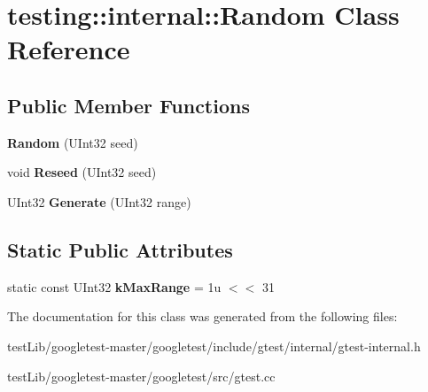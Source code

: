 \hypertarget{classtesting_1_1internal_1_1Random}{}\section{testing\+:\+:internal\+:\+:Random Class Reference}
\label{classtesting_1_1internal_1_1Random}
\subsection*{Public Member Functions}
\begin{DoxyCompactItemize}
\item 
\mbox{\label{classtesting_1_1internal_1_1Random_a6e112be5e7cce00551f6383025f69460}} 
{\bfseries Random} (U\+Int32 seed)
\item 
\mbox{\label{classtesting_1_1internal_1_1Random_adf2f24199318a46f885c78f50d89a69e}} 
void {\bfseries Reseed} (U\+Int32 seed)
\item 
\mbox{\label{classtesting_1_1internal_1_1Random_a9315b7fb621cbcfdf92ed4b5e584c0db}} 
U\+Int32 {\bfseries Generate} (U\+Int32 range)
\end{DoxyCompactItemize}
\subsection*{Static Public Attributes}
\begin{DoxyCompactItemize}
\item 
\mbox{\label{classtesting_1_1internal_1_1Random_a36d72dd7063d0b5338f229e75382fdd2}} 
static const U\+Int32 {\bfseries k\+Max\+Range} = 1u $<$$<$ 31
\end{DoxyCompactItemize}


The documentation for this class was generated from the following files\+:\begin{DoxyCompactItemize}
\item 
test\+Lib/googletest-\/master/googletest/include/gtest/internal/gtest-\/internal.\+h\item 
test\+Lib/googletest-\/master/googletest/src/gtest.\+cc\end{DoxyCompactItemize}
